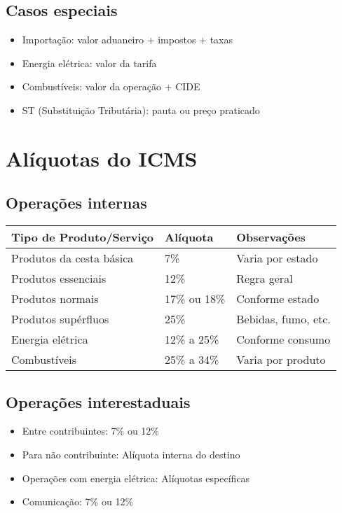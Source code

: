 \documentclass[12pt,a4paper]{article}
\begin{document}
\subsection{Casos especiais}
\begin{itemize}
    \item Importação: valor aduaneiro + impostos + taxas
    \item Energia elétrica: valor da tarifa
    \item Combustíveis: valor da operação + CIDE
    \item ST (Substituição Tributária): pauta ou preço praticado
\end{itemize}

\section{Alíquotas do ICMS}

\subsection{Operações internas}
\begin{longtable}{|p{6cm}|p{3cm}|p{5cm}|}
\hline
\textbf{Tipo de Produto/Serviço} & \textbf{Alíquota} & \textbf{Observações} \\
\hline
Produtos da cesta básica & 7\% & Varia por estado \\
\hline
Produtos essenciais & 12\% & Regra geral \\
\hline
Produtos normais & 17\% ou 18\% & Conforme estado \\
\hline
Produtos supérfluos & 25\% & Bebidas, fumo, etc. \\
\hline
Energia elétrica & 12\% a 25\% & Conforme consumo \\
\hline
Combustíveis & 25\% a 34\% & Varia por produto \\
\hline
\end{longtable}

\subsection{Operações interestaduais}
\begin{itemize}
    \item Entre contribuintes: 7\% ou 12\%
    \item Para não contribuinte: Alíquota interna do destino
    \item Operações com energia elétrica: Alíquotas específicas
    \item Comunicação: 7\% ou 12\%
\end{itemize}
\end{document}
